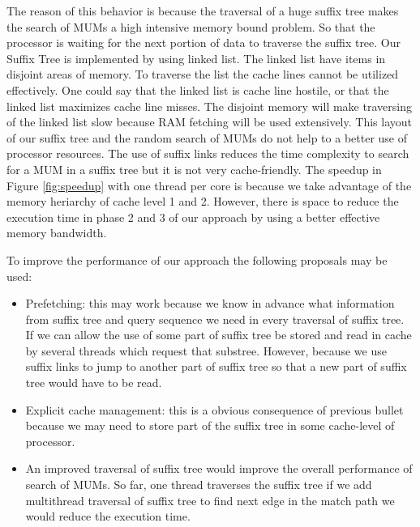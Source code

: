 \documentclass[conference]{IEEEtran}
\begin{document}
The reason of this behavior is because the traversal of a huge suffix tree makes the search of MUMs a high intensive memory bound problem. So that the processor is waiting for the next portion of data to traverse the suffix tree. Our Suffix Tree is implemented by using linked list. The linked list have items in disjoint areas of memory. To traverse the list the cache lines cannot be utilized effectively. One could say that the linked list is cache line hostile, or that the linked list maximizes cache line misses. The disjoint memory will make traversing of the linked list slow because RAM fetching will be used extensively. This layout of our suffix tree and the random search of MUMs do not help to a better use of processor resources. The use of suffix links reduces the time complexity to search for a MUM in a suffix tree but it is not very cache-friendly. The speedup in Figure \ref{fig:speedup} with one thread per core is because we take advantage of the memory heriarchy of cache level 1 and 2. However, there is space to reduce the execution time in phase 2 and 3 of our approach by using a better effective  memory bandwidth. 

To improve the performance of our approach the following proposals may be used:
\begin{itemize}
  \item Prefetching: this may work because we know in advance what information from suffix tree and query sequence we need in every traversal of suffix tree. If we can allow the use of some part of suffix tree be stored and read in cache by several threads which request that substree. However, because we use suffix links to jump to another part of suffix tree so that a new part of suffix tree would have to be read.
  \item Explicit cache management: this is a obvious consequence of previous bullet because we may need to store part of the suffix tree in some cache-level of processor.
  \item An improved traversal of suffix tree would improve the overall performance of search of MUMs. So far, one thread traverses the suffix tree if we add multithread traversal of suffix tree to find next edge in the match path we would reduce the execution time.
\end{itemize}
\end{document}
